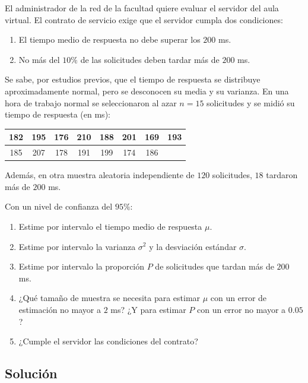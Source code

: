 \documentclass[10pt,letterpaper]{article}
\begin{document}
El administrador de la red de la facultad quiere evaluar el servidor del aula virtual. El contrato de servicio exige que el servidor cumpla dos condiciones:
\begin{enumerate}
    \item[(i)] El tiempo medio de respuesta no debe superar los $200$ ms.
    \item[(ii)] No más del $10\%$ de las solicitudes deben tardar más de $200$ ms.
\end{enumerate}

Se sabe, por estudios previos, que el tiempo de respuesta se distribuye aproximadamente normal, pero se desconocen su media y su varianza. En una hora de trabajo normal se seleccionaron al azar $n=15$ solicitudes y se midió su tiempo de respuesta (en ms):

\begin{center}
\begin{tabular}{|c|c|c|c|c|c|c|c|}
\hline
182 & 195 & 176 & 210 & 188 & 201 & 169 & 193 \\ \hline
185 & 207 & 178 & 191 & 199 & 174 & 186 & \\ \hline
\end{tabular}
\end{center}

Además, en otra muestra aleatoria independiente de $120$ solicitudes, $18$ tardaron más de $200$ ms.

Con un nivel de confianza del $95\%$:
\begin{enumerate}
    \item[a)] Estime por intervalo el tiempo medio de respuesta $\mu$.
    \item[b)] Estime por intervalo la varianza $\sigma^2$ y la desviación estándar $\sigma$.
    \item[c)] Estime por intervalo la proporción $P$ de solicitudes que tardan más de $200$ ms.
    \item[d)] ¿Qué tamaño de muestra se necesita para estimar $\mu$ con un error de estimación no mayor a $2$ ms? ¿Y para estimar $P$ con un error no mayor a $0.05$?
    \item[e)] ¿Cumple el servidor las condiciones del contrato?
\end{enumerate}

\subsection{Solución}
\end{document}
